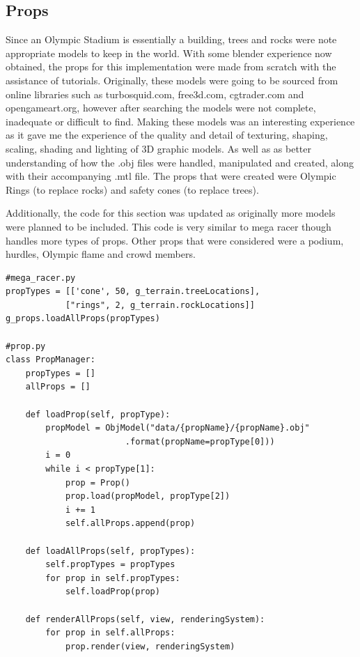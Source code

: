 \documentclass[a4 paper, 12pt]{article}
\begin{document}
\subsection{Props}
Since an Olympic Stadium is essentially a building, trees and rocks were note appropriate models to keep in the world. With some blender experience now obtained, the props for this implementation were made from scratch with the assistance of tutorials. Originally, these models were going to be sourced from online libraries such as turbosquid.com, free3d.com, cgtrader.com and opengameart.org, however after searching the models were not complete, inadequate or difficult to find. Making these models was an interesting experience as it gave me the experience of the quality and detail of texturing, shaping, scaling, shading and lighting of 3D graphic models. As well as as better understanding of how the .obj files were handled, manipulated and created, along with their accompanying .mtl file. The props that were created were Olympic Rings (to replace rocks) and safety cones (to replace trees). 

Additionally, the code for this section was updated as originally more models were planned to be included. This code is very similar to mega racer though handles more types of props. Other props that were considered were a podium, hurdles, Olympic flame and crowd members.

\begin{lstlisting}
#mega_racer.py
propTypes = [['cone', 50, g_terrain.treeLocations], 
            ["rings", 2, g_terrain.rockLocations]]
g_props.loadAllProps(propTypes)

#prop.py
class PropManager: 
    propTypes = []
    allProps = []    

    def loadProp(self, propType):
        propModel = ObjModel("data/{propName}/{propName}.obj"
                        .format(propName=propType[0]))
        i = 0
        while i < propType[1]:
            prop = Prop()
            prop.load(propModel, propType[2])         
            i += 1
            self.allProps.append(prop)

    def loadAllProps(self, propTypes):
        self.propTypes = propTypes
        for prop in self.propTypes:
            self.loadProp(prop)

    def renderAllProps(self, view, renderingSystem):
        for prop in self.allProps:
            prop.render(view, renderingSystem)    
    \end{lstlisting}
\end{document}
